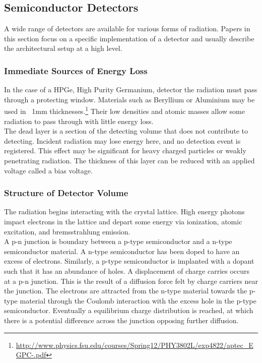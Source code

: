 \documentclass[12pt]{article}
\begin{document}
\begin{doublespacing}
\pagebreak
\subsection{Semiconductor Detectors}   %
A wide range of detectors are available for various forms of radiation.
Papers in this section focus on a specific implementation of a detector and usually describe the architectural setup at a high level.

\subsubsection{Immediate Sources of Energy Loss}

In the case of a HPGe, High Purity Germanium, detector the radiation must pass through a protecting window. 
Materials such as Beryllium or Aluminium may be used in ~1mm thicknesses.\footnote{\url{http://www.physics.fsu.edu/courses/Spring12/PHY3802L/exp4822/aptec_EGPC-.pdf}} 
Their low densities and atomic masses allow some radiation to pass through with little energy loss.
\\

The dead layer is a section of the detecting volume that does not contribute to detecting. 
Incident radiation may lose energy here, and no detection event is registered. 
This effect may be significant for heavy charged particles or weakly penetrating radiation.
The thickness of this layer can be reduced with an applied voltage called a bias voltage.
\\


\subsubsection{Structure of Detector Volume}

The radiation begins interacting with the crystal lattice. 
High energy photons impact electrons in the lattice and depart some energy via ionization, atomic excitation, and bremsstrahlung emission. 
\\

A p-n junction is boundary between a p-type semiconductor and a n-type semiconductor material. 
A n-type semiconductor has been doped to have an excess of electrons. 
Similarly, a p-type semiconductor is implanted with a dopant such that it has an abundance of holes. 
A displacement of charge carries occurs at a p-n junction. 
This is the result of a diffusion force felt by charge carriers near the junction. 
The electrons are attracted from the n-type material towards the p-type material through the Coulomb interaction with the excess hole in the p-type semiconductor. 
Eventually a equilibrium charge distribution is reached, at which there is a potential difference across the junction opposing further diffusion.
\\



\end{doublespacing}
\end{document}
